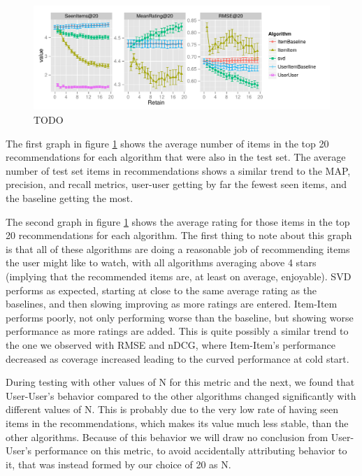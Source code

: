 \documentclass[letterpaper]{sig-alternate}
\begin{document}

\begin{figure}[ht!]
  \centering
  \includegraphics[width=1.1\linewidth]{../lenskit/output/ekstrandTuned20/rmse_20.pdf}
  \caption{TODO}
  \label{fig:topN.rmse}
\end{figure}


  The first graph in figure \ref{fig:topN.rmse} shows the average number of items in the top 20 recommendations for each algorithm that were also in the test set.
  The average number of test set items in recommendations shows a similar trend to the MAP, precision, and recall metrics, user-user getting by far the fewest seen items, and the baseline getting the most.

  The second graph in figure \ref{fig:topN.rmse} shows the average rating for those items in the top 20 recommendations for each algorithm.
  The first thing to note about this graph is that all of these algorithms are doing a reasonable job of recommending items the user might like to watch, with all algorithms averaging above 4 stars (implying that the recommended items are, at least on average, enjoyable).
  SVD performs as expected, starting at close to the same average rating as the baselines, and then slowing improving as more ratings are entered.
  Item-Item performs poorly, not only performing worse than the baseline, but showing worse performance as more ratings are added.
  This is quite possibly a similar trend to the one we observed with RMSE and nDCG, where Item-Item's performance decreased as coverage increased leading to the curved performance at cold start.
  
  During testing with other values of N for this metric and the next, we found that User-User's behavior compared to the other algorithms changed significantly with different values of N.
  This is probably due to the very low rate of having seen items in the recommendations, which makes its value much less stable, than the other algorithms.
  Because of this behavior we will draw no conclusion from User-User's performance on this metric, to avoid accidentally attributing behavior to it, that was instead formed by our choice of 20 as N.
  
\end{document}
